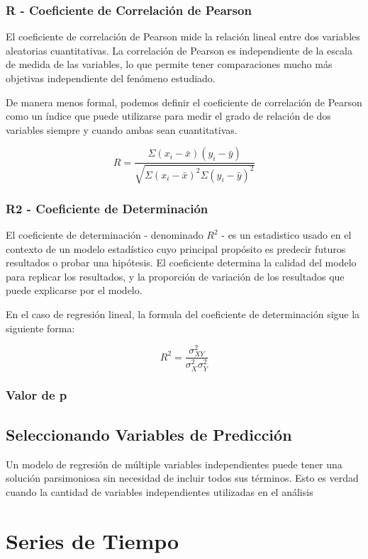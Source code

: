 \documentclass[letterpaper, spanish, 11pt]{report}
\begin{document}
\subsubsection{R - Coeficiente de Correlación de Pearson}
El coeficiente de correlación de Pearson mide la relación lineal entre dos variables aleatorias cuantitativas. La correlación de Pearson es independiente de la escala de medida de las variables, lo que permite tener comparaciones mucho más objetivas independiente del fenómeno estudiado.

De manera menos formal, podemos definir el coeficiente de correlación de Pearson como un índice que puede utilizarse para medir el grado de relación de dos variables siempre y cuando ambas sean cuantitativas.

\[R = \frac{\Sigma(x_i - \bar{x})(y_i - \bar{y})}{\sqrt{\Sigma(x_i - \bar{x})^2\Sigma(y_i - \bar{y})^2}}\]

\subsubsection{R2 - Coeficiente de Determinación}
El coeficiente de determinación - denominado \(R^{2}\) - es un estadistico usado en el contexto de un modelo estadístico cuyo principal propósito es predecir futuros resultados o probar una hipótesis. El coeficiente determina la calidad del modelo para replicar los resultados, y la proporción de variación de los resultados que puede explicarse por el modelo. 

En el caso de regresión lineal, la formula del coeficiente de determinación sigue la siguiente forma:

\[R^{2} = \frac{\sigma^{2}_{XY}}{\sigma^{2}_{X}\sigma^{2}_{Y}}\]

\subsubsection{Valor de p}

\subsection{Seleccionando Variables de Predicción}
Un modelo de regresión de múltiple variables independientes puede tener una solución parsimoniosa sin necesidad de incluir todos sus términos. Esto es verdad cuando la cantidad de variables independientes utilizadas en el análisis 

\section{Series de Tiempo}
\end{document}
